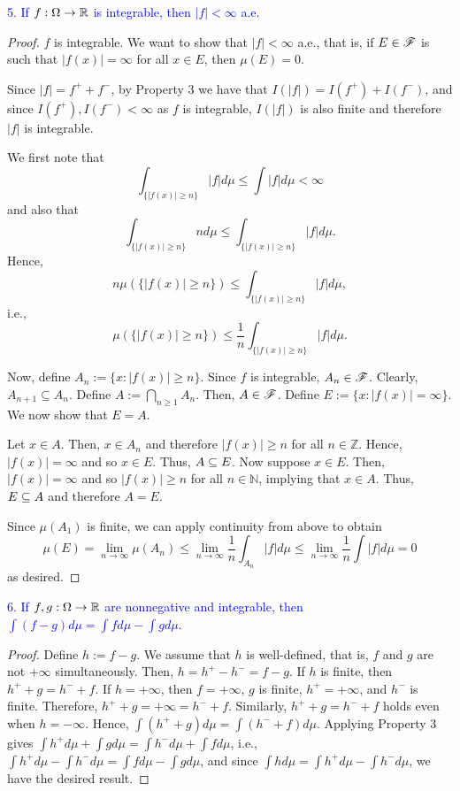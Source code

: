 \textcolor{blue}{5. If $f:\Omega \to \mathbb{R}$ is integrable, then $|f| < \infty$ a.e.}
\begin{proof}
    $f$ is integrable. We want to show that $|f| < \infty$ a.e., that is, if $E \in \mathscr{F}$ is such that $|f(x)| = \infty$ for all $x \in E$, then $\mu(E) = 0$.
    
    Since $|f| = f^+ + f^-$, by Property 3 we have that $I(|f|) = I(f^+) + I(f^-)$, and since $I(f^+), I(f^-) < \infty$ as $f$ is integrable, $I(|f|)$ is also finite and therefore $|f|$ is integrable.

    We first note that 
    \begin{equation*}
        \int_{\{|f(x)| \geq n\}} |f| d\mu \leq \int|f| d\mu < \infty
    \end{equation*}
    and also that $$\int_{\{|f(x)| \geq n\}} n d\mu \leq \int_{\{|f(x)| \geq n\}} |f| d\mu.$$ Hence, $$n \mu(\{|f(x)| \geq n\}) \leq \int_{\{|f(x)| \geq n\}} |f| d\mu,$$ i.e., $$\mu(\{|f(x)| \geq n\}) \leq \frac{1}{n}\int_{\{|f(x)| \geq n\}} |f| d\mu.$$

    Now, define $A_n := \{x: |f(x)| \geq n\}$. Since $f$ is integrable, $A_n \in \mathscr{F}$. Clearly, $A_{n + 1} \subseteq A_{n}$. Define $A := \bigcap_{n \geq 1} A_n$. Then, $A \in \mathscr{F}$. Define $E := \{ x : |f(x)| = \infty\}$. We now show that $E = A$. 
    
    Let $x \in A$. Then, $x \in A_n$ and therefore $|f(x)| \geq n$ for all $n \in \mathbb{Z}$. Hence, $|f(x)| = \infty$ and so $x \in E$. Thus, $A \subseteq E$. Now suppose $x \in E$. Then, $|f(x)| = \infty$ and so $|f(x)| \geq n$ for all $n \in \mathbb{N}$, implying that $x \in A$. Thus, $E \subseteq A$ and therefore $A = E$.

    Since $\mu(A_1)$ is finite, we can apply continuity from above to obtain
    \begin{equation*}
        \mu(E) = \lim_{n \to \infty} \mu(A_n) \leq \lim_{n \to \infty} \frac{1}{n} \int_{A_n} |f| d\mu \leq \lim_{n \to \infty} \frac{1}{n} \int|f|d\mu = 0
    \end{equation*}
    as desired.    
\end{proof}

\textcolor{blue}{6. If $f, g: \Omega \to \mathbb{R}$ are nonnegative and integrable, then $\int(f - g) d\mu = \int fd\mu - \int g d\mu$.}
\begin{proof}
    Define $h:= f - g$. We assume that $h$ is well-defined, that is, $f$ and $g$ are not $+\infty$ simultaneously. Then, $h = h^+ - h^- = f - g$. If $h$ is finite, then $h^+ + g = h^- + f$. If $h = +\infty$, then $f = +\infty$, $g$ is finite, $h^+ = +\infty$, and $h^-$ is finite. Therefore, $h^+ + g = +\infty = h^- + f$. Similarly, $h^+ + g = h^- + f$ holds even when $h = -\infty$. Hence, $\int(h^+ + g) d\mu = \int(h^- + f) d\mu$. Applying Property 3 gives $\int h^+ d\mu + \int g d\mu = \int h^- d\mu + \int f d\mu$, i.e., $\int h^+ d\mu - \int h^- d\mu = \int fd\mu - \int g d\mu$, and since $\int h d\mu = \int h^+ d\mu - \int h^- d\mu$, we have the desired result.
\end{proof}

